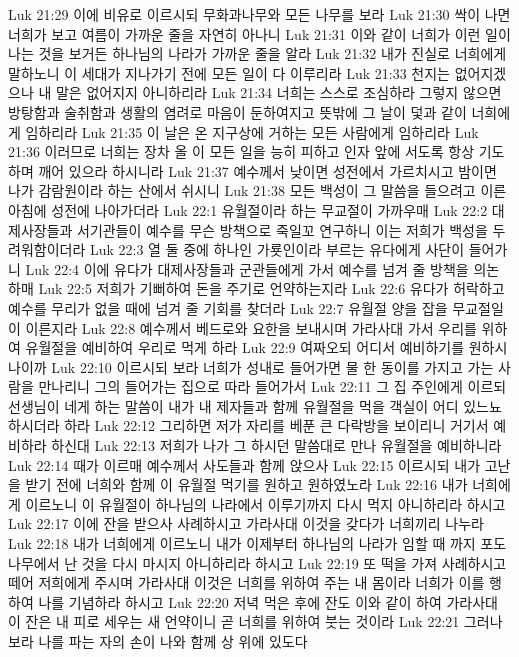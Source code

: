 Luk 21:29  이에 비유로 이르시되 무화과나무와 모든 나무를 보라
Luk 21:30  싹이 나면 너희가 보고 여름이 가까운 줄을 자연히 아나니
Luk 21:31  이와 같이 너희가 이런 일이 나는 것을 보거든 하나님의 나라가 가까운 줄을 알라
Luk 21:32  내가 진실로 너희에게 말하노니 이 세대가 지나가기 전에 모든 일이 다 이루리라
Luk 21:33  천지는 없어지겠으나 내 말은 없어지지 아니하리라
Luk 21:34  너희는 스스로 조심하라 그렇지 않으면 방탕함과 술취함과 생활의 염려로 마음이 둔하여지고 뜻밖에 그 날이 덫과 같이 너희에게 임하리라
Luk 21:35  이 날은 온 지구상에 거하는 모든 사람에게 임하리라
Luk 21:36  이러므로 너희는 장차 올 이 모든 일을 능히 피하고 인자 앞에 서도록 항상 기도하며 깨어 있으라 하시니라
Luk 21:37  예수께서 낮이면 성전에서 가르치시고 밤이면 나가 감람원이라 하는 산에서 쉬시니
Luk 21:38  모든 백성이 그 말씀을 들으려고 이른 아침에 성전에 나아가더라
Luk 22:1  유월절이라 하는 무교절이 가까우매
Luk 22:2  대제사장들과 서기관들이 예수를 무슨 방책으로 죽일꼬 연구하니 이는 저희가 백성을 두려워함이더라
Luk 22:3  열 둘 중에 하나인 가룟인이라 부르는 유다에게 사단이 들어가니
Luk 22:4  이에 유다가 대제사장들과 군관들에게 가서 예수를 넘겨 줄 방책을 의논하매
Luk 22:5  저희가 기뻐하여 돈을 주기로 언약하는지라
Luk 22:6  유다가 허락하고 예수를 무리가 없을 때에 넘겨 줄 기회를 찾더라
Luk 22:7  유월절 양을 잡을 무교절일이 이른지라
Luk 22:8  예수께서 베드로와 요한을 보내시며 가라사대 가서 우리를 위하여 유월절을 예비하여 우리로 먹게 하라
Luk 22:9  여짜오되 어디서 예비하기를 원하시나이까
Luk 22:10  이르시되 보라 너희가 성내로 들어가면 물 한 동이를 가지고 가는 사람을 만나리니 그의 들어가는 집으로 따라 들어가서
Luk 22:11  그 집 주인에게 이르되 선생님이 네게 하는 말씀이 내가 내 제자들과 함께 유월절을 먹을 객실이 어디 있느뇨 하시더라 하라
Luk 22:12  그리하면 저가 자리를 베푼 큰 다락방을 보이리니 거기서 예비하라 하신대
Luk 22:13  저희가 나가 그 하시던 말씀대로 만나 유월절을 예비하니라
Luk 22:14  때가 이르매 예수께서 사도들과 함께 앉으사
Luk 22:15  이르시되 내가 고난을 받기 전에 너희와 함께 이 유월절 먹기를 원하고 원하였노라
Luk 22:16  내가 너희에게 이르노니 이 유월절이 하나님의 나라에서 이루기까지 다시 먹지 아니하리라 하시고
Luk 22:17  이에 잔을 받으사 사례하시고 가라사대 이것을 갖다가 너희끼리 나누라
Luk 22:18  내가 너희에게 이르노니 내가 이제부터 하나님의 나라가 임할 때 까지 포도나무에서 난 것을 다시 마시지 아니하리라 하시고
Luk 22:19  또 떡을 가져 사례하시고 떼어 저희에게 주시며 가라사대 이것은 너희를 위하여 주는 내 몸이라 너희가 이를 행하여 나를 기념하라 하시고
Luk 22:20  저녁 먹은 후에 잔도 이와 같이 하여 가라사대 이 잔은 내 피로 세우는 새 언약이니 곧 너희를 위하여 붓는 것이라
Luk 22:21  그러나 보라 나를 파는 자의 손이 나와 함께 상 위에 있도다
